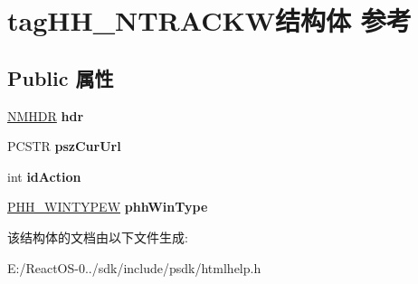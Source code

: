 \hypertarget{structtag_h_h___n_t_r_a_c_k_w}{}\section{tag\+H\+H\+\_\+\+N\+T\+R\+A\+C\+K\+W结构体 参考}
\label{structtag_h_h___n_t_r_a_c_k_w}
\subsection*{Public 属性}
\begin{DoxyCompactItemize}
\item 
\mbox{\label{structtag_h_h___n_t_r_a_c_k_w_a7fc5b019880d7837697aafd6037f11dc}} 
\hyperlink{structtag_n_m_h_d_r}{N\+M\+H\+DR} {\bfseries hdr}
\item 
\mbox{\label{structtag_h_h___n_t_r_a_c_k_w_aff82bce76dae7b1d15566331bdf96f7f}} 
P\+C\+S\+TR {\bfseries psz\+Cur\+Url}
\item 
\mbox{\label{structtag_h_h___n_t_r_a_c_k_w_a079874e1a216cdf8f37303237bfc8337}} 
int {\bfseries id\+Action}
\item 
\mbox{\label{structtag_h_h___n_t_r_a_c_k_w_a0f3d134549a4eaad9865ae39caed9ee5}} 
\hyperlink{structtag_h_h___w_i_n_t_y_p_e_w}{P\+H\+H\+\_\+\+W\+I\+N\+T\+Y\+P\+EW} {\bfseries phh\+Win\+Type}
\end{DoxyCompactItemize}


该结构体的文档由以下文件生成\+:\begin{DoxyCompactItemize}
\item 
E\+:/\+React\+O\+S-\/0../sdk/include/psdk/htmlhelp.\+h\end{DoxyCompactItemize}
